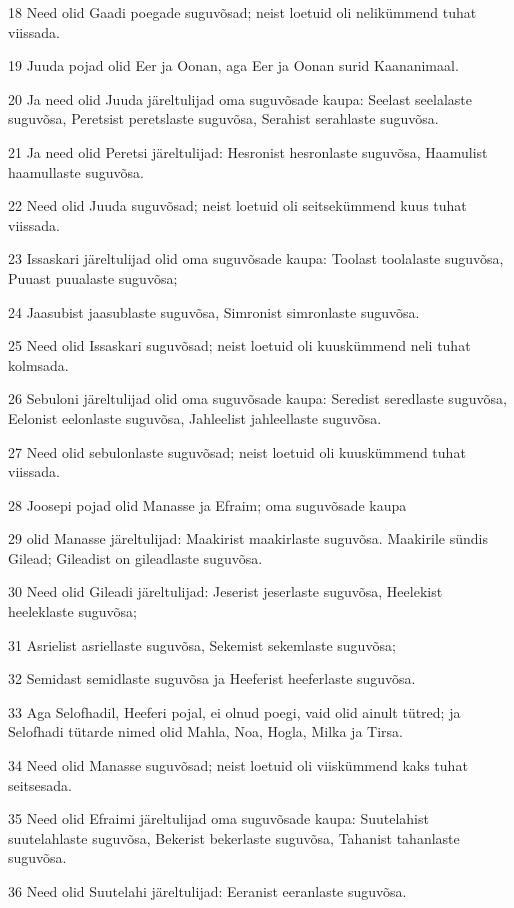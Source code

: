 \par 18 Need olid Gaadi poegade suguvõsad; neist loetuid oli nelikümmend tuhat viissada.
\par 19 Juuda pojad olid Eer ja Oonan, aga Eer ja Oonan surid Kaananimaal.
\par 20 Ja need olid Juuda järeltulijad oma suguvõsade kaupa: Seelast seelalaste suguvõsa, Peretsist peretslaste suguvõsa, Serahist serahlaste suguvõsa.
\par 21 Ja need olid Peretsi järeltulijad: Hesronist hesronlaste suguvõsa, Haamulist haamullaste suguvõsa.
\par 22 Need olid Juuda suguvõsad; neist loetuid oli seitsekümmend kuus tuhat viissada.
\par 23 Issaskari järeltulijad olid oma suguvõsade kaupa: Toolast toolalaste suguvõsa, Puuast puualaste suguvõsa;
\par 24 Jaasubist jaasublaste suguvõsa, Simronist simronlaste suguvõsa.
\par 25 Need olid Issaskari suguvõsad; neist loetuid oli kuuskümmend neli tuhat kolmsada.
\par 26 Sebuloni järeltulijad olid oma suguvõsade kaupa: Seredist seredlaste suguvõsa, Eelonist eelonlaste suguvõsa, Jahleelist jahleellaste suguvõsa.
\par 27 Need olid sebulonlaste suguvõsad; neist loetuid oli kuuskümmend tuhat viissada.
\par 28 Joosepi pojad olid Manasse ja Efraim; oma suguvõsade kaupa
\par 29 olid Manasse järeltulijad: Maakirist maakirlaste suguvõsa. Maakirile sündis Gilead; Gileadist on gileadlaste suguvõsa.
\par 30 Need olid Gileadi järeltulijad: Jeserist jeserlaste suguvõsa, Heelekist heeleklaste suguvõsa;
\par 31 Asrielist asriellaste suguvõsa, Sekemist sekemlaste suguvõsa;
\par 32 Semidast semidlaste suguvõsa ja Heeferist heeferlaste suguvõsa.
\par 33 Aga Selofhadil, Heeferi pojal, ei olnud poegi, vaid olid ainult tütred; ja Selofhadi tütarde nimed olid Mahla, Noa, Hogla, Milka ja Tirsa.
\par 34 Need olid Manasse suguvõsad; neist loetuid oli viiskümmend kaks tuhat seitsesada.
\par 35 Need olid Efraimi järeltulijad oma suguvõsade kaupa: Suutelahist suutelahlaste suguvõsa, Bekerist bekerlaste suguvõsa, Tahanist tahanlaste suguvõsa.
\par 36 Need olid Suutelahi järeltulijad: Eeranist eeranlaste suguvõsa.
